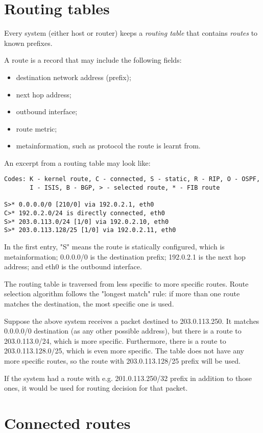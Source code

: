 \section{Routing tables}

Every system (either host or router) keeps a \emph{routing table} that contains \emph{routes} to known prefixes.

A route is a record that may include the following fields:
\begin{itemize}
  \item destination network address (prefix);
  \item next hop address;
  \item outbound interface;
  \item route metric;
  \item metainformation, such as protocol the route is learnt from.
\end{itemize}

An excerpt from a routing table may look like:
\begin{verbatim}
Codes: K - kernel route, C - connected, S - static, R - RIP, O - OSPF,
       I - ISIS, B - BGP, > - selected route, * - FIB route

S>* 0.0.0.0/0 [210/0] via 192.0.2.1, eth0
C>* 192.0.2.0/24 is directly connected, eth0
S>* 203.0.113.0/24 [1/0] via 192.0.2.10, eth0
S>* 203.0.113.128/25 [1/0] via 192.0.2.11, eth0
\end{verbatim}

In the first entry, "S" means the route is statically configured, which is metainformation;
0.0.0.0/0 is the destination prefix; 192.0.2.1 is the next hop address; and eth0 is the
outbound interface.

The routing table is traversed from less specific to more specific routes. Route selection
algorithm follows the "longest match" rule: if more than one route matches the destination,
the most specific one is used.

Suppose the above system receives a packet destined to 203.0.113.250. It matches 0.0.0.0/0
destination (as any other possible address), but there is a route to 203.0.113.0/24, which is
more specific. Furthermore, there is a route to 203.0.113.128.0/25, which is even more specific.
The table does not have any more specific routes, so the route with 203.0.113.128/25 prefix 
will be used.

If the system had a route with e.g. 201.0.113.250/32 prefix in addition to those ones, it would
be used for routing decision for that packet.



\section{Connected routes}


